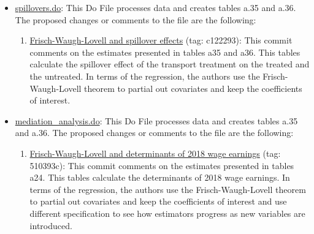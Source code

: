 \documentclass{article}
\begin{document}
\begin{itemize}
\begin{enumerate}[label=\roman*,resume]
            \end{enumerate}
            
        \item \href{https://github.com/jorgeluis8ar/Revised-reproduction-package-for-Abebe-et-al-2021/blob/main/Proposed\%20Replication\%20File/do/spillovers.do}{spillovers.do}: This Do File processes data and creates tables a.35 and a.36. The proposed changes or comments to the file are the following:
        
            \begin{enumerate}[label=\roman*,resume]
            
                \item \href{https://github.com/jorgeluis8ar/Revised-reproduction-package-for-Abebe-et-al-2021/commit/c1222935e2bf0b50c2eb634b05204e26f6625980}{Frisch-Waugh-Lovell and spillover effects} (tag: c122293): This commit comments on the estimates presented in tables a35 and a36. This tables calculate the spillover effect of the transport treatment on the treated and the untreated. In terms of the regression, the authors use the Frisch-Waugh-Lovell theorem to partial out covariates and keep the coefficients of interest.
                
            \end{enumerate}
        
        \item \href{https://github.com/jorgeluis8ar/Revised-reproduction-package-for-Abebe-et-al-2021/blob/main/Proposed\%20Replication\%20File/do/mediation_analysis.do}{mediation_analysis.do}: This Do File processes data and creates tables a.35 and a.36. The proposed changes or comments to the file are the following:
    
            \begin{enumerate}[label=\roman*,resume]
            
                \item \href{https://github.com/jorgeluis8ar/Revised-reproduction-package-for-Abebe-et-al-2021/commit/510393cf5a80245095b881ccb230c5c3905f2f05}{Frisch-Waugh-Lovell and determinants of 2018 wage earnings} (tag: 510393c): This commit comments on the estimates presented in tables a24. This tables calculate the determinants of 2018 wage earnings. In terms of the regression, the authors use the Frisch-Waugh-Lovell theorem to partial out covariates and keep the coefficients of interest and use different specification to see how estimators progress as new variables are introduced.
                

\end{enumerate}
\end{itemize}
\end{document}

